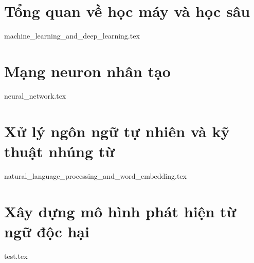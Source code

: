 \section{Tổng quan về học máy và học sâu}
{machine_learning_and_deep_learning.tex}

\section{Mạng neuron nhân tạo}
{neural_network.tex}

\section{Xử lý ngôn ngữ tự nhiên và kỹ thuật nhúng từ}
{natural_language_processing_and_word_embedding.tex}

\section{Xây dựng mô hình phát hiện từ ngữ độc hại}
{test.tex}
